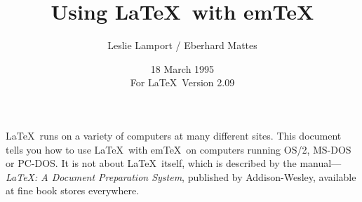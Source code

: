 %
%
%
 
 
 
\newcommand{\contact}{Eberhard Mattes}
 
\newcommand{\BibTeX}{{\rm B\kern-.05em{\sc i\kern-.025em b}\kern-.08em
    T\kern-.1667em\lower.7ex\hbox{E}\kern-.125emX}}
 
 
\newcommand\bs{\char '134 }   %
\newcommand{\lb}{\char '173 } %
\newcommand{\rb}{\char '175 } %
 
\title{Using \LaTeX\ with em\TeX}
 
\author{Leslie Lamport / Eberhard Mattes}
 
\date{18 March 1995\\              %
For \LaTeX\ Version 2.09} 
 

 
\maketitle
 
\tableofcontents
 
\newpage
 
\LaTeX\ runs on a variety of computers at many different sites.  This
document tells you how to use \LaTeX\ with em\TeX\ on computers
running OS/2, MS-DOS or PC-DOS.
It is not about \LaTeX\ itself, which is described by
the manual---{\em \LaTeX: A Document Preparation System}, published by
Addison-Wesley, available at fine book stores everywhere.
 
